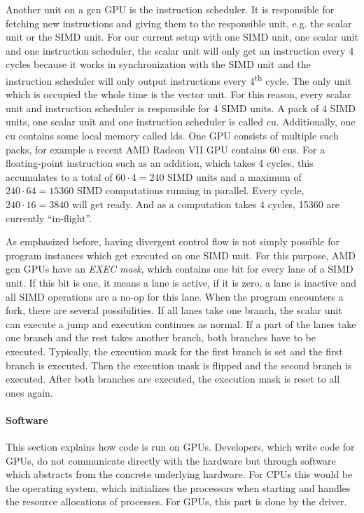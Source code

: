 Another unit on a \gls{gcn} GPU is the instruction scheduler. It is responsible for fetching new instructions and giving them to the responsible unit, e.g. the scalar unit or the SIMD unit. For our current setup with one SIMD unit, one scalar unit and one instruction scheduler, the scalar unit will only get an instruction every 4 cycles because it works in synchronization with the SIMD unit and the instruction scheduler will only output instructions every 4\textsuperscript{th} cycle. The only unit which is occupied the whole time is the vector unit. For this reason, every scalar unit and instruction scheduler is responsible for 4 SIMD units. A pack of 4 SIMD units, one scalar unit and one instruction scheduler is called \gls{cu}. Additionally, one \gls{cu} contains some local memory called \gls{lds}. One GPU consists of multiple such packs, for example a recent AMD Radeon VII GPU contains 60 \glspl{cu}. For a floating-point instruction such as an addition, which takes 4 cycles, this accumulates to a total of $60 \cdot 4 = 240$ SIMD units and a maximum of $240 \cdot 64 = 15360$ SIMD computations running in parallel. Every cycle, $240 \cdot 16 = 3840$ will get ready. And as a computation takes 4 cycles, 15360 are currently \enquote{in-flight}.

As emphasized before, having divergent control flow is not simply possible for program instances which get executed on one SIMD unit. For this purpose, AMD \gls{gcn} GPUs have an \emph{EXEC mask}, which contains one bit for every lane of a SIMD unit. If this bit is one, it means a lane is active, if it is zero, a lane is inactive and all SIMD operations are a no-op for this lane. When the program encounters a fork, there are several possibilities. If all lanes take one branch, the scalar unit can execute a jump and execution continues as normal. If a part of the lanes take one branch and the rest takes another branch, both branches have to be executed. Typically, the execution mask for the first branch is set and the first branch is executed. Then the execution mask is flipped and the second branch is executed. After both branches are executed, the execution mask is reset to all ones again.

\paragraph{Software} This section explains how code is run on GPUs. Developers, which write code for GPUs, do not communicate directly with the hardware but through software which abstracts from the concrete underlying hardware. For CPUs this would be the operating system, which initializes the processors when starting and handles the resource allocations of processes. For GPUs, this part is done by the driver.

